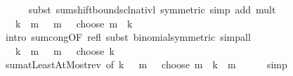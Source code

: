 \begin{isabellebody}
\ \ \ \ \isamarkupfalse%
\ {\isacharparenleft}{\kern0pt}subst\ sum{\isachardot}{\kern0pt}shift{\isacharunderscore}{\kern0pt}bounds{\isacharunderscore}{\kern0pt}cl{\isacharunderscore}{\kern0pt}nat{\isacharunderscore}{\kern0pt}ivl\ {\isacharbrackleft}{\kern0pt}symmetric{\isacharbrackright}{\kern0pt}{\isacharparenright}{\kern0pt}\ {\isacharparenleft}{\kern0pt}simp\ add{\isacharcolon}{\kern0pt}\ mult{\isacharunderscore}{\kern0pt}{}{\isacharparenright}{\kern0pt}\isanewline
\ \ \isamarkupfalse%
\ \isamarkupfalse%
\ {\isachardoublequoteopen}{\isasymdots}\ {\isacharequal}{\kern0pt}\ {\isacharparenleft}{\kern0pt}{\isasymSum}k\ {\isacharequal}{\kern0pt}\ {}{\isachardot}{\kern0pt}{\isachardot}{\kern0pt}m{\isachardot}{\kern0pt}\ {\isacharparenleft}{\kern0pt}{}\ {\isacharasterisk}{\kern0pt}\ m\ {\isacharplus}{\kern0pt}\ {}\ choose\ {\isacharparenleft}{\kern0pt}m\ {\isacharminus}{\kern0pt}\ k{\isacharparenright}{\kern0pt}{\isacharparenright}{\kern0pt}{\isacharparenright}{\kern0pt}{\isachardoublequoteclose}\isanewline
\ \ \ \ \isamarkupfalse%
\ {\isacharparenleft}{\kern0pt}intro\ sum{\isachardot}{\kern0pt}cong{\isacharbrackleft}{\kern0pt}OF\ refl{\isacharbrackright}{\kern0pt}{\isacharcomma}{\kern0pt}\ subst\ binomial{\isacharunderscore}{\kern0pt}symmetric{\isacharparenright}{\kern0pt}\ simp{\isacharunderscore}{\kern0pt}all\isanewline
\ \ \isamarkupfalse%
\ \isamarkupfalse%
\ {\isachardoublequoteopen}{\isasymdots}\ {\isacharequal}{\kern0pt}\ {\isacharparenleft}{\kern0pt}{\isasymSum}k\ {\isacharequal}{\kern0pt}\ {}{\isachardot}{\kern0pt}{\isachardot}{\kern0pt}m{\isachardot}{\kern0pt}\ {\isacharparenleft}{\kern0pt}{}\ {\isacharasterisk}{\kern0pt}\ m\ {\isacharplus}{\kern0pt}\ {}\ choose\ k{\isacharparenright}{\kern0pt}{\isacharparenright}{\kern0pt}{\isachardoublequoteclose}\isanewline
\ \ \ \ \isamarkupfalse%
\ sum{\isachardot}{\kern0pt}atLeastAtMost{\isacharunderscore}{\kern0pt}rev\ {\isacharbrackleft}{\kern0pt}of\ {\isachardoublequoteopen}{\isasymlambda}k{\isachardot}{\kern0pt}\ {}\ {\isacharasterisk}{\kern0pt}\ m\ {\isacharplus}{\kern0pt}\ {}\ choose\ {\isacharparenleft}{\kern0pt}m\ {\isacharminus}{\kern0pt}\ k{\isacharparenright}{\kern0pt}{\isachardoublequoteclose}\ {}\ m{\isacharbrackright}{\kern0pt}\isanewline
\ \ \ \ \isamarkupfalse%
\ simp\isanewline
\ \ \isamarkupfalse%
\ \isamarkupfalse%

\end{isabellebody}
